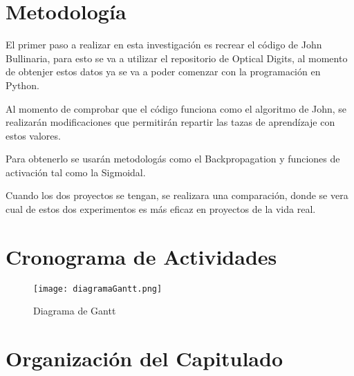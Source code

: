 \section{Metodología}
    El primer paso a realizar en esta investigación es recrear el código de John Bullinaria,
    para esto se va a utilizar el repositorio de Optical Digits, al momento de obtenjer estos datos
    ya se va a poder comenzar con la programación en Python.

    Al momento de comprobar que el código funciona como el algoritmo de John, se realizarán modificaciones
    que permitirán repartir las tazas de aprendízaje con estos valores.

    Para obtenerlo se usarán metodologás como el Backpropagation y funciones de activación tal como la Sigmoidal.

    Cuando los dos proyectos se tengan, se realizara una comparación, donde se vera cual de estos dos experimentos
    es más eficaz en proyectos de la vida real.
    
\section{Cronograma de Actividades}

    \begin{figure}[H]
        \centering
        \texttt{[image: diagramaGantt.png]}
        \caption{Diagrama de Gantt}
        \label{fig:fig3}
    \end{figure}

\section{Organización del Capitulado}